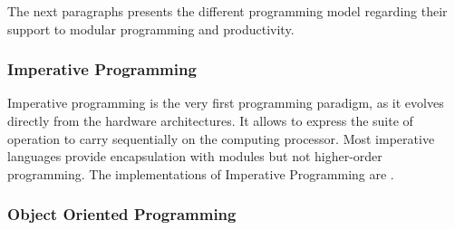The next paragraphs presents the different programming model regarding their support to modular programming and productivity.

\subsubsection{Imperative Programming}





Imperative programming is the very first programming paradigm, as it evolves directly from the hardware architectures.
It allows to express the suite of operation to carry sequentially on the computing processor.
Most imperative languages provide encapsulation with modules but not higher-order programming. %
The implementations of Imperative Programming are .

\subsubsection{Object Oriented Programming}

